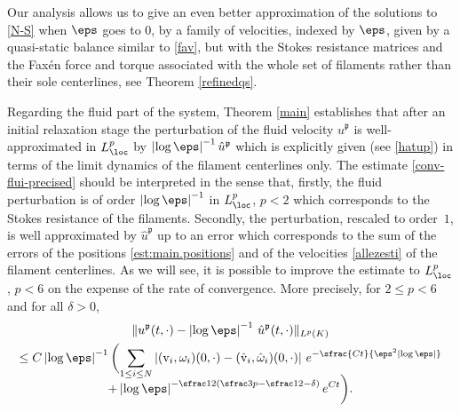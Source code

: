 Our analysis allows us to give an even better approximation of the solutions to \eqref{N-S} when $\eps$ goes to $0$,
by a family of velocities, indexed by $\eps$, given by a quasi-static balance similar to \eqref{fav}, but with the Stokes resistance matrices and the Faxén force and torque
associated with the whole set of filaments rather than their sole centerlines, see Theorem \ref{refinedqs}.

Regarding the fluid part of the system, Theorem \ref{main} establishes that
after an initial relaxation stage the perturbation of the fluid velocity ${u}^\mathfrak{p}$ is well-approximated in $L^p_\loc$ by $\left|\log \eps\right|^{-1} \hat {u}^\mathfrak{p}$ which is explicitly given (see \eqref{hatup}) in terms of the limit dynamics of the filament centerlines only. The estimate
\eqref{conv-flui-precised} should be interpreted in the sense that, firstly, the fluid perturbation is of order $\left|\log \eps\right|^{-1}$ in $L^p_\loc$, $p<2$ which corresponds to the Stokes resistance of the filaments. Secondly, the perturbation, rescaled to order~$1$, is well approximated by $ \hat {u}^\mathfrak{p}$ up to an error which corresponds to the sum of the errors of the positions \eqref{est:main.positions} and of the velocities \eqref{allezesti} of the filament centerlines.
As we will see, it is possible to improve the estimate to $L^p_\loc$, $p< 6$ on the expense of the rate of convergence. More precisely, for $2 \leq p < 6$ and for all $\delta > 0$,
\begin{multline}
\label{conv-flui-precised.comment}
\| u^\mathfrak{p}(t,\cdot) - \left|\log \eps\right|^{-1} \, {\hat u}^\mathfrak{p} (t,\cdot) \|_{L^p (K) } \\
\leq
C \left|\log \eps\right|^{-1} \biggl(\sum_{1 \leq i \leq N} \left| (\textrm{v}_i,\omega_i) (0,\cdot) - (\hat{\textrm{v}}_i,{\hat \omega}_i)(0,\cdot)
\right| \, e^{- \sfrac{C t}{\eps^2 \left|\log \eps\right|}}\\[-8pt]
+ \left|\log \eps\right|^{-\sfrac 1 2(\sfrac 3 p - \sfrac 1 2 - \delta)} e^{C t} \biggr).
\end{multline}

